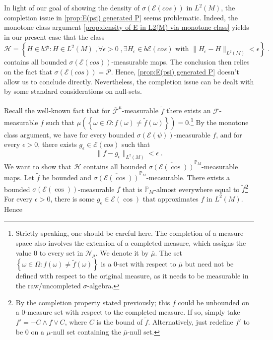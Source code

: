 \documentclass[11pt]{report}
\theoremstyle{plain} %
\theoremstyle{definition} %
\theoremstyle{remark} %
\begin{document}
In light of our goal of showing the density of \(\sigma(\mathcal{E}(cos))\) in \(L^2(M)\), the completion issue in \cref{prop:E(psi) generated P} seems problematic. Indeed, the monotone class argument \cref{prop:density of E in L2(M) via monotone class} yields in our present case that the class 
\begin{equation}
     \mathcal{H}=\left\{ H\in b\mathcal{P}:H\in L^2(M)\;,\forall \epsilon>0\;, \exists H_{\epsilon}\in b\mathcal{E}(cos)\text{ with }\lVert H_{\epsilon}-H\rVert_{L^2(M)}<\epsilon\right\}\;.
\end{equation}
contains all bounded \(\sigma(\mathcal{E}(cos))\)-measurable maps. The conclusion then relies on the fact that \(\sigma(\mathcal{E}(cos))=\mathcal{P}\).  Hence, \cref{prop:E(psi) generated P} doesn't allow us to conclude directly. Nevertheless, the completion issue can be dealt with by some standard considerations on null-sets.
\\\\
Recall the well-known fact that for \(\overline{\mathcal{F}}^{\mu}\)-measurable \(\widetilde{f}\)  there exists an \(\mathcal{F}\)-measurable \(f\) such that \(\mu(\left\{\omega\in\Omega:f(\omega)\neq \widetilde{f}(\omega)\right\})=0\).\footnote{Strictly speaking, one should be careful here. The completion of a measure space also involves the extension of a completed measure, which assigns the value \(0\) to every set in \(\mathcal{N}_{\mu}\). We denote it by \(\overline{\mu}\). The set \(\left\{\omega\in\Omega:f(\omega)\neq \widetilde{f}(\omega)\right\}\) is a \(0\)-set with respect to \(\overline{\mu}\) but need not be defined with respect to the original measure, as it needs to be measurable in the raw/uncompleted \(\sigma\)-algebra.} By the monotone class argument, we have for every bounded \(\sigma(\mathcal{E}(\psi))\)-measurable \(f\), and for every \(\epsilon>0\), there exists \(g_{\epsilon}\in \mathcal{E}(cos)\) such that 
 \begin{equation}
     \lVert f-g_{\epsilon}\rVert_{L^2(M)}<\epsilon\;.
 \end{equation}
 We want to show that \(\mathcal{H}\) contains all bounded \(\overline{\sigma(\mathcal{E}(\cos))}^{\mathbb{P}_M}\)-measurable maps. Let \(\widetilde{f}\) be bounded and \(\overline{\sigma(\mathcal{E}(\cos))}^{\mathbb{P}_M}\)-measurable. There exists a bounded \(\sigma(\mathcal{E}(\cos))\)-measurable \(f\) that is \(\mathbb{P}_M\)-almost everywhere equal to \(\widetilde{f}\)\footnote{By the completion property stated previously; this \(f\) could be unbounded on a \(0\)-measure set with respect to the completed measure. If so, simply take \(f'=-C\wedge f\vee C\), where \(C\) is the bound of \(\widetilde{f}\). Alternatively, just redefine \(f'\) to be \(0\) on a \(\mu\)-null set containing the \(\overline{\mu}\)-null set.} For every \(\epsilon>0\), there is some \(g_{\epsilon}\in\mathcal{E}(\cos)\) that approximates \(f\) in \(L^2(M)\). Hence 
\end{document}

